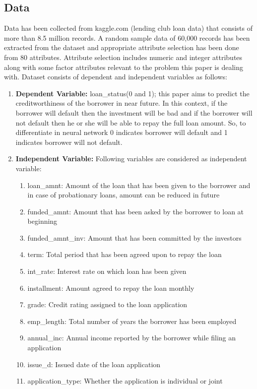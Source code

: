 \documentclass{article}[]
\begin{document}
\subsection{Data}
Data has been collected from kaggle.com (lending club loan data) that consists of more than 8.5 million records. A random sample data of 60,000 records has been extracted from the dataset and appropriate attribute selection has been done from 80 attributes. Attribute selection includes numeric and integer attributes along with some factor attributes relevant to the problem this paper is dealing with. Dataset consists of dependent and independent variables as follows: 
\begin{enumerate}
\item \textbf{Dependent Variable:} loan\_status(0 and 1); this paper aims to predict the creditworthiness of the borrower in near future. In this context, if the borrower will default then the investment will be bad and if the borrower will not default then he or she will be able to repay the full loan amount. So, to differentiate in neural network 0 indicates borrower will default and 1 indicates borrower will not default.
\item \textbf{Independent Variable:} Following variables are considered as independent variable:
\begin{enumerate}
\item loan\_amnt: Amount of the loan that has been given to the borrower and in case of probationary loans, amount can be reduced in future
\item funded\_amnt: Amount that has been asked by the borrower to loan at beginning
\item funded\_amnt\_inv: Amount that has been committed by the investors
\item term: Total period that has been agreed upon to repay the loan
\item int\_rate: Interest rate on which loan has been given
\item installment: Amount agreed to repay the loan monthly
\item grade: Credit rating assigned to the loan application
\item emp\_length: Total number of years the borrower has been employed
\item annual\_inc: Annual income reported by the borrower while filing an application 
\item issue\_d: Issued date of the loan application
\item application\_type: Whether the application is individual or joint
\end{enumerate} 
\end{enumerate}
\end{document}
